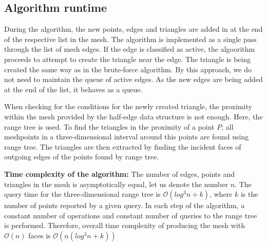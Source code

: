 \subsection{Algorithm runtime}
During the algorithm, the new points, edges and triangles are added in
at the end of the respective list in the mesh. 
The algorithm is implemented as a single pass through the list of 
mesh edges. 
If the edge is classified as active, the algoorithm proceeds 
to attempt to create the triangle near the edge. 
The triangle is being created the same way as in the brute-force
algorithm.
By this approach, we do not need to
maintain the queue of active edges. As the new edges are being added at 
the end of the list, it behaves as a queue.

When checking for the conditions for the newly created triangle, the 
proximity within the mesh provided by the half-edge data structure is
not enough. Here, the range tree is used. To find the triangles in the
proximity of a point $P$, all meshpoints in a three-dimensional interval
around this points are found using range tree. The triangles are then 
extracted by finding the incident faces of outgoing edges of the points
found by range tree.

\textbf{Time complexity of the algorithm:}
The number of edges, points and triangles in the mesh is asymptotically 
equal, let us denote the number $n$. The query time for the three-dimensional 
range tree is $\mathcal{O}(log^3n+k)$, where $k$ is the number of points
reported by a given query. In each step of the algorithm, a constant number of
operations and constant number of queries to the range tree is performed.
Therefore, overall time complexity of producing the mesh with $\mathcal{O}(n)$
faces is $\mathcal{O}(n (log^3n+k))$